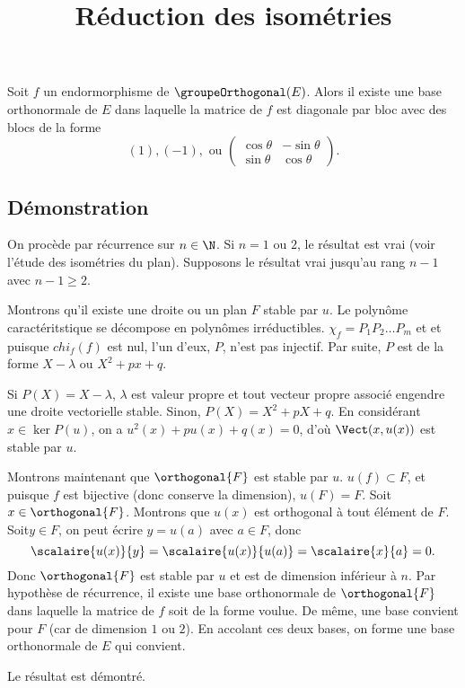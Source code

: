 \documentclass[fontsize=12pt,twoside=false,parskip=half]{scrartcl}
\title{Réduction des isométries}
\date{}
\author{}
\begin{document}
\maketitle
   \begin{Theoreme}
      Soit $f$ un endormorphisme de $\groupeOrthogonal(E)$. Alors il existe une base orthonormale de $E$ dans laquelle 
      la matrice de $f$ est diagonale par bloc avec des blocs de la forme
      \[
         (1), (-1), \text{ ou }
         \begin{pmatrix}
            \cos \theta & - \sin \theta \\
            \sin \theta & \cos \theta
         \end{pmatrix}.
      \]
   \end{Theoreme}
   \subsection{Démonstration}
      On procède par récurrence sur $n \in \N$. Si $n = 1$ ou $2$, le résultat est vrai (voir l’étude des isométries
      du plan). Supposons le résultat vrai jusqu’au rang $n - 1$ avec $n - 1 \geq 2$. 
      
      Montrons qu’il existe une droite ou un plan $F$ stable par $u$. Le polynôme caractéritstique se décompose en 
      polynômes irréductibles. $\chi_f = P_1P_2\ldots P_m$ et et puisque $chi_f(f)$ est nul, l’un d’eux, $P$, n’est 
      pas injectif. Par suite, $P$ est de la forme $X - \lambda$ ou $X^2 + px + q$. 
      
      Si $P(X) = X - \lambda$, $\lambda$ est valeur propre et tout vecteur propre associé engendre une droite 
      vectorielle stable. Sinon, $P(X) = X^2 + pX + q$. En considérant $x \in \ker P(u)$, on a $u^2(x) + pu(x) + q(x) = 0$,
      d’où $\Vect(x, u(x))$ est stable par $u$.
      
      Montrons maintenant que $\orthogonal{F}$ est stable par $u$. $u(f) \subset F$, et puisque $f$ est bijective 
      (donc conserve la dimension), $u(F) = F$. Soit $x \in \orthogonal{F}$. Montrons que $u(x)$ est orthogonal à 
      tout élément de $F$. Soit$y \in F$, on peut écrire $y = u(a)$ avec $a \in F$, donc
      \[
         \scalaire{u(x)}{y} = \scalaire{u(x)}{u(a)} = \scalaire{x}{a} = 0.
      \]
      Donc $\orthogonal{F}$ est stable par $u$ et est de dimension inférieur à $n$. Par hypothèse de récurrence, il 
      existe une base orthonormale de $\orthogonal{F}$ dans laquelle la matrice de $f$ soit de la forme voulue. De même,
      une base convient pour $F$ (car de dimension $1$ ou $2$). En accolant ces deux bases, on forme une base 
      orthonormale de $E$ qui convient.
      
      Le résultat est démontré.
\end{document}
